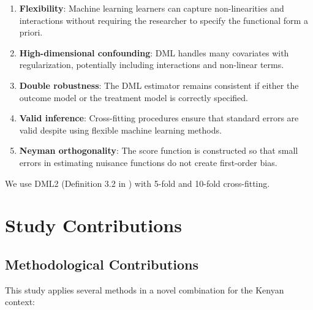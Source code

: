 \begin{enumerate}
	\item \textbf{Flexibility}: Machine learning learners can capture non-linearities and interactions without requiring the researcher to specify the functional form a priori.
	
	\item \textbf{High-dimensional confounding}: DML handles many covariates with regularization, potentially including interactions and non-linear terms.
	
	\item \textbf{Double robustness}: The DML estimator remains consistent if either the outcome model or the treatment model is correctly specified.
	
	\item \textbf{Valid inference}: Cross-fitting procedures ensure that standard errors are valid despite using flexible machine learning methods.
	
	\item \textbf{Neyman orthogonality}: The score function is constructed so that small errors in estimating nuisance functions do not create first-order bias.
\end{enumerate}

We use DML2 (Definition 3.2 in \citealp{chernozhukov2018double}) with 5-fold and 10-fold cross-fitting.

\section{Study Contributions}

\subsection{Methodological Contributions}

This study applies several methods in a novel combination for the Kenyan context:


